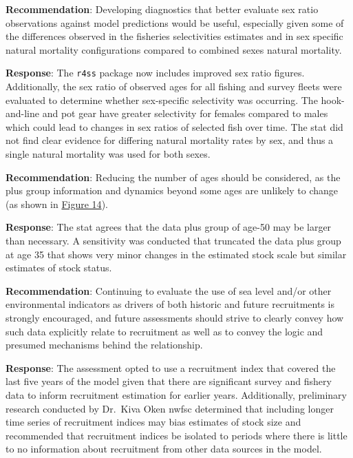 \documentclass[
  english,
]{article}
\begin{document}
\textbf{Recommendation}: Developing diagnostics that better evaluate sex
ratio observations against model predictions would be useful, especially
given some of the differences observed in the fisheries selectivities
estimates and in sex specific natural mortality configurations compared
to combined sexes natural mortality.

\textbf{Response}: The \texttt{r4ss} package now includes improved sex
ratio figures. Additionally, the sex ratio of observed ages for all
fishing and survey fleets were evaluated to determine whether
sex-specific selectivity was occurring. The hook-and-line and pot gear
have greater selectivity for females compared to males which could lead
to changes in sex ratios of selected fish over time. The \gls{stat} did
not find clear evidence for differing natural mortality rates by sex,
and thus a single natural mortality was used for both sexes.

\textbf{Recommendation}: Reducing the number of ages should be
considered, as the plus group information and dynamics beyond some ages
are unlikely to change (as shown in
\href{(https://www.pcouncil.org/documents/2019/10/sablefish-star-panel-report-july-8-12-2019.pdf/\#page\%20=\%2029)}{Figure
14}).

\textbf{Response}: The \gls{stat} agrees that the data plus group of
age-50 may be larger than necessary. A sensitivity was conducted that
truncated the data plus group at age 35 that shows very minor changes in
the estimated stock scale but similar estimates of stock status.

\textbf{Recommendation}: Continuing to evaluate the use of sea level
and/or other environmental indicators as drivers of both historic and
future recruitments is strongly encouraged, and future assessments
should strive to clearly convey how such data explicitly relate to
recruitment as well as to convey the logic and presumed mechanisms
behind the relationship.

\textbf{Response}: The assessment opted to use a recruitment index that
covered the last five years of the model given that there are
significant survey and fishery data to inform recruitment estimation for
earlier years. Additionally, preliminary research conducted by Dr.~Kiva
Oken \gls{nwfsc} determined that including longer time series of
recruitment indices may bias estimates of stock size and recommended
that recruitment indices be isolated to periods where there is little to
no information about recruitment from other data sources in the model.
\end{document}
